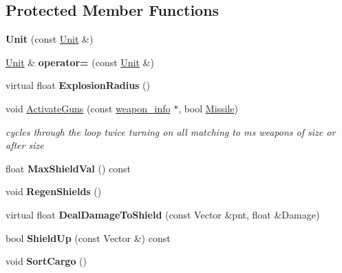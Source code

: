 \subsection*{Protected Member Functions}
\begin{DoxyCompactItemize}
\item 
{\bfseries Unit} (const \hyperlink{classUnit}{Unit} \&)\hypertarget{classUnit_ae7351c99c228ee3bad29e47a8716aa22}{}\label{classUnit_ae7351c99c228ee3bad29e47a8716aa22}

\item 
\hyperlink{classUnit}{Unit} \& {\bfseries operator=} (const \hyperlink{classUnit}{Unit} \&)\hypertarget{classUnit_a995197dc4e9397d7df9b53766c8d6874}{}\label{classUnit_a995197dc4e9397d7df9b53766c8d6874}

\item 
virtual float {\bfseries Explosion\+Radius} ()\hypertarget{classUnit_ab9842d4ca561d695d1a843a968664c8b}{}\label{classUnit_ab9842d4ca561d695d1a843a968664c8b}

\item 
void \hyperlink{classUnit_abc0044c1104ac923e6750fd56fc1ae40}{Activate\+Guns} (const \hyperlink{structweapon__info}{weapon\+\_\+info} $\ast$, bool \hyperlink{classMissile}{Missile})\hypertarget{classUnit_abc0044c1104ac923e6750fd56fc1ae40}{}\label{classUnit_abc0044c1104ac923e6750fd56fc1ae40}

\begin{DoxyCompactList}\small\item\em cycles through the loop twice turning on all matching to ms weapons of size or after size \end{DoxyCompactList}\item 
float {\bfseries Max\+Shield\+Val} () const \hypertarget{classUnit_abe536ba1fd66db0bda6fd12ba5969e2b}{}\label{classUnit_abe536ba1fd66db0bda6fd12ba5969e2b}

\item 
void {\bfseries Regen\+Shields} ()\hypertarget{classUnit_a877cb0708d4feca257cd10b5566fdfa1}{}\label{classUnit_a877cb0708d4feca257cd10b5566fdfa1}

\item 
virtual float {\bfseries Deal\+Damage\+To\+Shield} (const Vector \&pnt, float \&Damage)\hypertarget{classUnit_aa6185b41d261cf9d72e4b49ef3ec436f}{}\label{classUnit_aa6185b41d261cf9d72e4b49ef3ec436f}

\item 
bool {\bfseries Shield\+Up} (const Vector \&) const \hypertarget{classUnit_a69304c4967dd1d2e076e3077e21f4194}{}\label{classUnit_a69304c4967dd1d2e076e3077e21f4194}

\item 
void {\bfseries Sort\+Cargo} ()\hypertarget{classUnit_a01a5755fb77b31e93a64a4a0769fdadf}{}\label{classUnit_a01a5755fb77b31e93a64a4a0769fdadf}

\end{DoxyCompactItemize}
